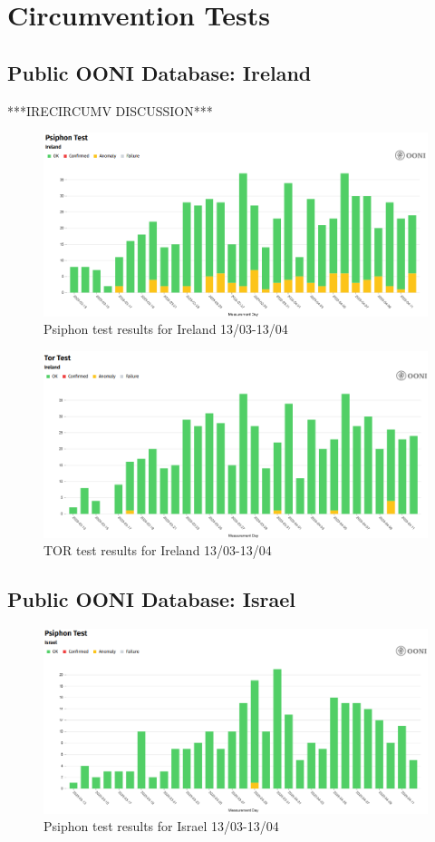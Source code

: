 \section{Circumvention Tests}
\subsection{Public OONI Database: Ireland}

***IRECIRCUMV DISCUSSION***

\begin{figure} [H]
    \centering
    \includegraphics[width=0.5\linewidth]{IREDBPSI.png}
    \caption{Psiphon test results for Ireland 13/03-13/04}
    \label{fig:enter-label}
\end{figure}

\begin{figure} [H]
    \centering
    \includegraphics[width=0.5\linewidth]{IREDBTOR.png}
    \caption{TOR test results for Ireland 13/03-13/04}
    \label{fig:enter-label}
\end{figure}

\subsection{Public OONI Database: Israel}

\begin{figure} [H]
    \centering
    \includegraphics[width=0.5\linewidth]{ISROONIPSI.png}
    \caption{Psiphon test results for Israel 13/03-13/04}
    \label{fig:enter-label}
\end{figure}

